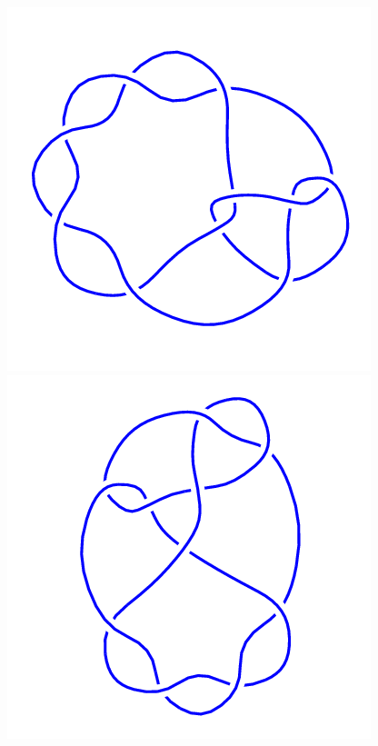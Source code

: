 \begin{figure}[H]
\begin{minipage}[b]{.18\linewidth}
    \end{minipage}
    \begin{minipage}[b]{.18\linewidth}
        \centering
        \includegraphics[width=\linewidth]{../data/10_124.png}
    \end{minipage}
    \begin{minipage}[b]{.18\linewidth}
        \centering
        \includegraphics[width=\linewidth]{../data/10_125.png}

\end{minipage}
\end{figure}

